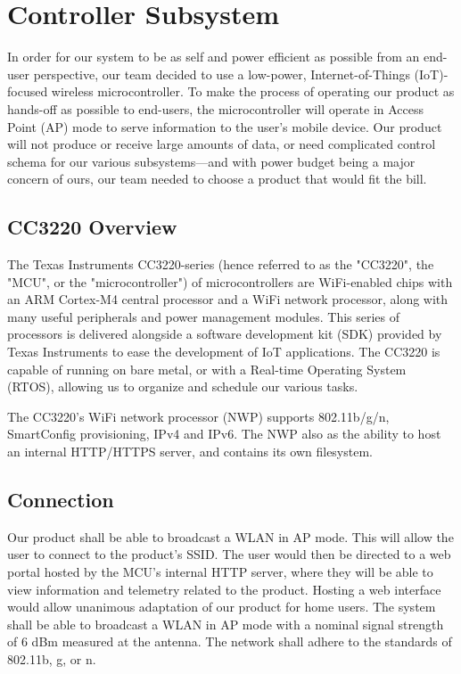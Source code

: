 \section{Controller Subsystem}

In order for our system to be as self and power efficient as possible from an end-user perspective, our team decided to use a low-power, Internet-of-Things (IoT)-focused wireless microcontroller. To make the process of operating our product as hands-off as possible to end-users, the microcontroller will operate in Access Point (AP) mode to serve information to the user's mobile device. Our product will not produce or receive large amounts of data, or need complicated control schema for our various subsystems---and with power budget being a major concern of ours, our team needed to choose a product that would fit the bill.

\subsection{CC3220 Overview}
The Texas Instruments CC3220-series (hence referred to as the "CC3220", the "MCU", or the "microcontroller") of microcontrollers are WiFi-enabled chips with an ARM Cortex-M4 central processor and a WiFi network processor, along with many useful peripherals and power management modules. This series of processors is delivered alongside a software development kit (SDK) provided by Texas Instruments to ease the development of IoT applications. The CC3220 is capable of running on bare metal, or with a Real-time Operating System (RTOS), allowing us to organize and schedule our various tasks.

The CC3220's WiFi network processor (NWP) supports 802.11b/g/n, SmartConfig provisioning, IPv4 and IPv6. The NWP also as the ability to host an internal HTTP/HTTPS server, and contains its own filesystem.

\subsection{Connection}
Our product shall be able to broadcast a WLAN in AP mode. This will allow the user to connect to the product's SSID. The user would then be directed to a web portal hosted by the MCU's internal HTTP server, where they will be able to view information and telemetry related to the product. Hosting a web interface would allow unanimous adaptation of our product for home users. The system shall be able to broadcast a WLAN in AP mode with a nominal signal strength of 6 dBm measured at the antenna. The network shall adhere to the standards of 802.11b, g, or n. 

